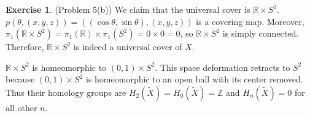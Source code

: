\documentclass[12pt, psamsfonts]{amsart}
\theoremstyle{definition}
\newtheorem*{exer}{Exercise}
\theoremstyle{remark}
\numberwithin{equation}{section}
\begin{document}
\begin{exer}{(Problem 5(b))}
  We claim that the universal cover is $\mathbb{R} \times S^2$.
  $p(\theta, (x, y, z)) = ((\cos \theta, \sin \theta), (x, y, z))$ is a covering map.
  Moreover, $\pi_1(\mathbb{R} \times S^2) = \pi_1(\mathbb{R}) \times \pi_1(S^2) = 0 \times 0 = 0$, so $\mathbb{R} \times S^2$ is simply connected.
  Therefore, $\mathbb{R} \times S^2$ is indeed a universal cover of $X$.

  $\mathbb{R} \times S^2$ is homeomorphic to $(0, 1) \times S^2$.
  This space deformation retracts to $S^2$ because $(0, 1) \times S^2$ is homeomorphic to an open ball with its center removed.
  Thus their homology groups are $H_2(\tilde{X}) = H_0(\tilde{X}) = \mathbb{Z}$ and $H_n(\tilde{X}) = 0$ for all other $n$.
\end{exer}
\end{document}
